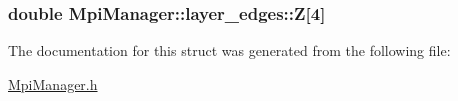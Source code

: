 \subsubsection[{\texorpdfstring{Z}{Z}}]{\setlength{\rightskip}{0pt plus 5cm}double Mpi\+Manager\+::layer\+\_\+edges\+::Z\mbox{[}4\mbox{]}}\hypertarget{struct_mpi_manager_1_1layer__edges_a25eea1176a0c06c1e25a7a08b8840283}{}\label{struct_mpi_manager_1_1layer__edges_a25eea1176a0c06c1e25a7a08b8840283}


The documentation for this struct was generated from the following file\+:\begin{DoxyCompactItemize}
\item 
\hyperlink{_mpi_manager_8h}{Mpi\+Manager.\+h}\end{DoxyCompactItemize}
